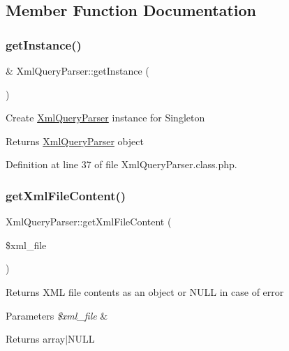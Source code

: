 \subsection{Member Function Documentation}
\hypertarget{classXmlQueryParser_af6558a14a48242f4082d4b05e24b66be}{}\label{classXmlQueryParser_af6558a14a48242f4082d4b05e24b66be} 
\subsubsection{\texorpdfstring{get\+Instance()}{getInstance()}}
{\footnotesize\ttfamily \& Xml\+Query\+Parser\+::get\+Instance (\begin{DoxyParamCaption}{ }\end{DoxyParamCaption})}

Create \hyperlink{classXmlQueryParser}{Xml\+Query\+Parser} instance for Singleton

\begin{DoxyReturn}{Returns}
\hyperlink{classXmlQueryParser}{Xml\+Query\+Parser} object 
\end{DoxyReturn}


Definition at line 37 of file Xml\+Query\+Parser.\+class.\+php.

\hypertarget{classXmlQueryParser_aed43fc81b117c0d90948cb70cdad6280}{}\label{classXmlQueryParser_aed43fc81b117c0d90948cb70cdad6280} 
\subsubsection{\texorpdfstring{get\+Xml\+File\+Content()}{getXmlFileContent()}}
{\footnotesize\ttfamily Xml\+Query\+Parser\+::get\+Xml\+File\+Content (\begin{DoxyParamCaption}\item[{}]{\$xml\+\_\+file }\end{DoxyParamCaption})}

Returns X\+ML file contents as an object or N\+U\+LL in case of error


\begin{DoxyParams}{Parameters}
{\em \$xml\+\_\+file} & \\
\hline
\end{DoxyParams}
\begin{DoxyReturn}{Returns}
array$\vert$\+N\+U\+LL 
\end{DoxyReturn}


